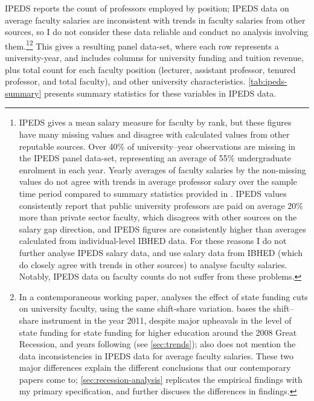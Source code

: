 IPEDS reports the count of professors employed by position; IPEDS data on average faculty salaries are inconsistent with trends in faculty salaries from other sources, so I do not consider these data reliable and conduct no analysis involving them.\footnote{
    IPEDS gives a mean salary measure for faculty by rank, but these figures have many missing values and disagree with calculated values from other reputable sources.
    Over 40\% of university--year observations are missing in the IPEDS panel data-set, representing an average of 55\% undergraduate enrolment in each year.
    Yearly averages of faculty salaries by the non-missing values do not agree with trends in average professor salary over the sample time period compared to summary statistics provided in \cite{aau2021survey}.
    IPEDS values consistently report that public university professors are paid on average 20\% more than private sector faculty, which disagrees with other sources on the salary gap direction, and IPEDS figures are consistently higher than averages calculated from individual-level IBHED data.
    For these reasons I do not further analyse IPEDS salary data, and use salary data from IBHED (which do closely agree with trends in other sources) to analyse faculty salaries.
    Notably, IPEDS data on faculty counts do not suffer from these problems.
}\footnote{
    In a contemporaneous working paper, \cite{hinrichs2022state} analyses the effect of state funding cuts on university faculty, using the same shift-share variation.
    \cite{hinrichs2022state} bases the shift--share instrument in the year 2011, despite major upheavals in the level of state funding for state funding for higher education around the 2008 Great Recession, and years following (see \autoref{sec:trends});
    \cite{hinrichs2022state} also does not mention the data inconsistencies in IPEDS data for average faculty salaries.
    These two major differences explain the different conclusions that our contemporary papers come to; \autoref{sec:recession-analysis} replicates the \cite{hinrichs2022state} empirical findings with my primary specification, and further discuses the differences in findings.
}
This gives a resulting panel data-set, where each row represents a university-year, and includes columns for university funding and tuition revenue, plus total count for each faculty position (lecturer, assistant professor, tenured professor, and total faculty), and other university characteristics.
\autoref{tab:ipeds-summary} presents summary statistics for these variables in IPEDS data.

